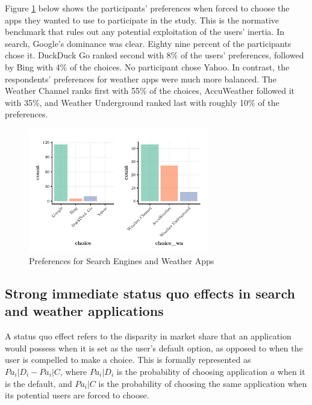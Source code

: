 \documentclass[
  11pt,
]{article}
\begin{document}
Figure \ref{fig:preferences} below shows the participants' preferences when forced to choose the apps they wanted to use to participate in the study. This is the normative benchmark that rules out any potential exploitation of the users' inertia. In search, Google's dominance was clear. Eighty nine percent of the participants chose it. DuckDuck Go ranked second with 8\% of the users' preferences, followed by Bing with 4\% of the choices. No participant chose Yahoo. In contrast, the respondents' preferences for weather apps were much more balanced. The Weather Channel ranks first with 55\% of the choices, AccuWeather followed it with 35\%, and Weather Underground ranked last with roughly 10\% of the preferences.

\begin{figure}

{\centering \includegraphics[width=0.7\textwidth]{Results-July25_files/figure-latex/preferences-1} 

}

\caption{Preferences for Search Engines and Weather Apps}\label{fig:preferences}
\end{figure}

\hypertarget{strong-immediate-status-quo-effects-in-search-and-weather-applications}{%
\subsection{Strong immediate status quo effects in search and weather applications}\label{strong-immediate-status-quo-effects-in-search-and-weather-applications}}

A status quo effect refers to the disparity in market share that an application would possess when it is set as the user's default option, as opposed to when the user is compelled to make a choice. This is formally represented as \(Pa_i|D_i - Pa_i|C\), where \(Pa_i|D_i\) is the probability of choosing application \(a\) when it is the default, and \(Pa_i|C\) is the probability of choosing the same application when its potential users are forced to choose.
\end{document}

